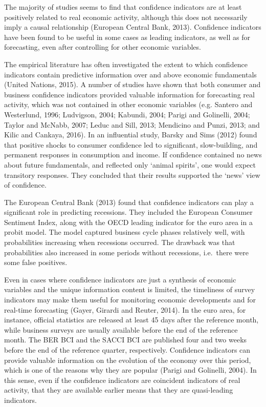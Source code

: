 \documentclass[11pt,]{article}
\begin{document}
The majority of studies seems to find that confidence indicators are at
least positively related to real economic activity, although this does
not necessarily imply a causal relationship (European Central Bank,
2013). Confidence indicators have been found to be useful in some cases
as leading indicators, as well as for forecasting, even after
controlling for other economic variables.

The empirical literature has often investigated the extent to which
confidence indicators contain predictive information over and above
economic fundamentals (United Nations, 2015). A number of studies have
shown that both consumer and business confidence indicators provided
valuable information for forecasting real activity, which was not
contained in other economic variables (e.g. Santero and Westerlund,
1996; Ludvigson, 2004; Kabundi, 2004; Parigi and Golinelli, 2004; Taylor
and McNabb, 2007; Leduc and Sill, 2013; Mendicino and Punzi, 2013; and
Kilic and Cankaya, 2016). In an influential study, Barsky and Sims
(2012) found that positive shocks to consumer confidence led to
significant, slow-building, and permanent responses in consumption and
income. If confidence contained no news about future fundamentals, and
reflected only `animal spirits', one would expect transitory responses.
They concluded that their results supported the `news' view of
confidence.

The European Central Bank (2013) found that confidence indicators can
play a significant role in predicting recessions. They included the
European Consumer Sentiment Index, along with the OECD leading indicator
for the euro area in a probit model. The model captured business cycle
phases relatively well, with probabilities increasing when recessions
occurred. The drawback was that probabilities also increased in some
periods without recessions, i.e.~there were some false positives.

Even in cases where confidence indicators are just a synthesis of
economic variables and the unique information content is limited, the
timeliness of survey indicators may make them useful for monitoring
economic developments and for real-time forecasting (Gayer, Girardi and
Reuter, 2014). In the euro area, for instance, official statistics are
released at least 45 days after the reference month, while business
surveys are usually available before the end of the reference month. The
BER BCI and the SACCI BCI are published four and two weeks before the
end of the reference quarter, respectively. Confidence indicators can
provide valuable information on the evolution of the economy over this
period, which is one of the reasons why they are popular (Parigi and
Golinelli, 2004). In this sense, even if the confidence indicators are
coincident indicators of real activity, that they are available earlier
means that they are quasi-leading indicators.
\end{document}

